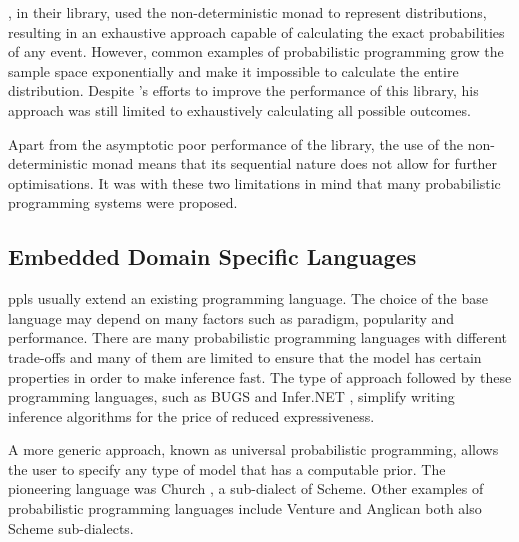 \documentclass[
  oneside,
  11pt, a4paper,
  footinclude=true,
  headinclude=true,
  cleardoublepage=empty
]{scrbook}
\theoremstyle{definition}
\theoremstyle{definition}
\begin{document}
         \cite{erwig_kollmansberger_2006}, in their library, used the non-deterministic monad to represent distributions, resulting in an exhaustive approach capable of calculating the exact probabilities of any event. However, common examples of probabilistic programming grow the sample space exponentially and make it impossible to calculate the entire distribution. Despite \cite{larsen2011memory}'s efforts to improve the performance of this library, his approach was still limited to exhaustively calculating all possible outcomes.
                
         Apart from the asymptotic poor performance of the \cite{erwig_kollmansberger_2006} library, the use of the non-deterministic monad means that its sequential nature does not allow for further optimisations. It was with these two limitations in mind that many probabilistic programming systems were proposed.
        
        \subsection{Embedded Domain Specific Languages}\label{rel-work-edsl}
        
        \glspl{ppl} usually extend an existing programming language. The choice of the base language may depend on many factors such as paradigm, popularity and performance. There are many probabilistic programming languages with different trade-offs \citep{Scibior:2015:PPP:2887747.2804317} and many of them are limited to ensure that the model has certain properties in order to make inference fast. The type of approach followed by these programming languages, such as BUGS \citep{gilks1994language} and Infer.NET \citep{minkainfer}, simplify writing inference algorithms for the price of reduced expressiveness.
        
        A more generic approach, known as universal probabilistic programming, allows the user to specify any type of model that has a computable prior. The pioneering language was Church \citep{goodman2012church}, a sub-dialect of Scheme. Other examples of probabilistic programming languages include Venture and Anglican \citep{mansinghka2014venture, tolpin2015probabilistic} both also Scheme sub-dialects. 
                
\end{document}
